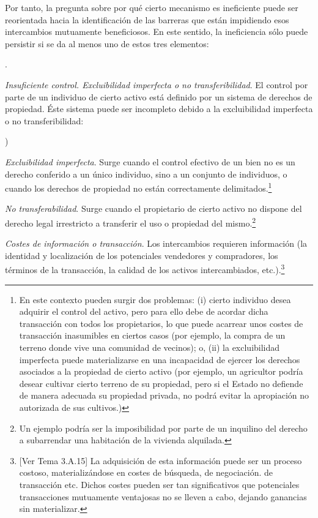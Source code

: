 \documentclass[10pt,a4paper]{article}
\newcounter{alphaitem}
\newcounter{numitem}
\newenvironment{la}
      {\begin{list}{\alph{alphaitem})}{%
          \usecounter{alphaitem}%
          \setlength{\leftmargin}{1cm}%
          \setlength{\parskip}{3pt}%
          \setlength{\itemsep}{0pt}%
          \setlength{\parsep}{0pt}%
      }}
      {\end{list}}
\newenvironment{lnum}
      {\begin{list}{\arabic{numitem}.}{%
          \usecounter{numitem}%
          \setlength{\leftmargin}{1cm}%
          \setlength{\parskip}{3pt}%
          \setlength{\itemsep}{0pt}%
          \setlength{\parsep}{0pt}%
      }}
      {\end{list}}
\newcommand{\authorfont}[1]{{\fontfamily{EBGaramond-TLF}\selectfont #1}}
\begin{document}
Por tanto, la pregunta sobre por qué cierto mecanismo es ineficiente puede ser reorientada hacia la identificación de las barreras que están impidiendo esos intercambios mutuamente beneficiosos. En este sentido, la ineficiencia sólo puede persistir si se da al menos uno de estos tres elementos:

\begin{lnum}
    \item \textit{Insuficiente control. Excluibilidad imperfecta o no transferibilidad}. El control por parte de un individuo de cierto activo está definido por un sistema de derechos de propiedad. Éste sistema puede ser incompleto debido a la excluibilidad imperfecta o no transferibilidad:
    \begin{la}
        \item \textit{Excluibilidad imperfecta}. Surge cuando el control efectivo de un bien no es un derecho conferido a un único individuo, sino a un conjunto de individuos, o cuando los derechos de propiedad no están correctamente delimitados.\footnote{%
            En este contexto pueden surgir dos problemas: (i) cierto individuo desea adquirir el control del activo, pero para ello debe de acordar dicha transacción con todos los propietarios, lo que puede acarrear unos costes de transacción inasumibles en ciertos casos (por ejemplo, la compra de un terreno donde vive una comunidad de vecinos); o, (ii) la excluibilidad imperfecta puede materializarse en una incapacidad de ejercer los derechos asociados a la propiedad de cierto activo (por ejemplo, un agricultor podría desear cultivar cierto terreno de su propiedad, pero si el Estado no defiende de manera adecuada su propiedad privada, no podrá evitar la apropiación no autorizada de sus cultivos.)
        } 
        \item  \textit{No transferabilidad}. Surge cuando el propietario de cierto activo no dispone del derecho legal irrestricto a transferir el uso o propiedad del mismo.\footnote{%
            Un ejemplo podría ser la imposibilidad por parte de un inquilino del derecho a subarrendar una habitación de la vivienda alquilada.
        }
    \end{la}
\item \textit{Costes de información o transacción}. Los intercambios requieren información (la identidad y localización de los potenciales vendedores y compradores, los términos de la transacción, la calidad de los activos intercambiados, etc.).\footnote{%
    [\authorfont{Ver Tema 3.A.15}] La adquisición de esta información puede ser un proceso costoso, materializándose en costes de búsqueda, de negociación. de transacción etc. Dichos costes pueden ser tan significativos que potenciales transacciones mutuamente ventajosas no se lleven a cabo, dejando ganancias sin materializar.
}
\end{lnum}
\end{document}
